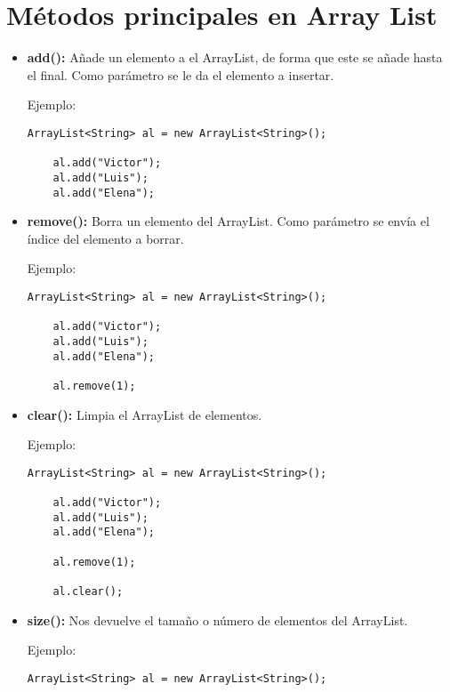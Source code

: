\documentclass[12pt, letterpaper]{article} %
\begin{document}
\section*{Métodos principales en Array List}
\begin{itemize}
    \item \textbf{add():} Añade un elemento a el ArrayList, de forma que este se añade hasta el final. Como parámetro se le da el elemento a insertar.
    
    Ejemplo:
    \lstset{language = Java, breaklines=true, basicstyle=\footnotesize}
    \begin{lstlisting}[frame=single]
    ArrayList<String> al = new ArrayList<String>();
    
    al.add("Victor");
    al.add("Luis");
    al.add("Elena");
    \end{lstlisting}
    
    \item \textbf{remove():} Borra un elemento del ArrayList. Como parámetro se envía el índice del elemento a borrar.
    
    Ejemplo:
    \lstset{language = Java, breaklines=true, basicstyle=\footnotesize}
    \begin{lstlisting}[frame=single]
    ArrayList<String> al = new ArrayList<String>();

    al.add("Victor");    
    al.add("Luis");    
    al.add("Elena");
    
    al.remove(1);
    \end{lstlisting}
    
    \item \textbf{clear():} Limpia el ArrayList de elementos.
    
    Ejemplo:
    \lstset{language = Java, breaklines=true, basicstyle=\footnotesize}
    \begin{lstlisting}[frame=single]
    ArrayList<String> al = new ArrayList<String>();

    al.add("Victor");
    al.add("Luis");
    al.add("Elena");
    
    al.remove(1);

    al.clear();
    \end{lstlisting}
    
    \item \textbf{size():} Nos devuelve el tamaño o número de elementos del ArrayList.
    
    Ejemplo:
    \lstset{language = Java, breaklines=true, basicstyle=\footnotesize}
    \begin{lstlisting}[frame=single]
    ArrayList<String> al = new ArrayList<String>();
    

\end{lstlisting}
\end{itemize}
\end{document}
